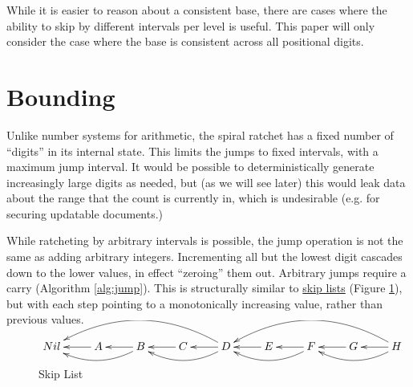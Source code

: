 \documentclass{article}
\begin{document}
	While it is easier to reason about a consistent base, there are cases where the ability to skip by different intervals per level is useful. This paper will only consider the case where the base is consistent across all positional digits.
    
    \section{Bounding}
    
    Unlike number systems for arithmetic, the spiral ratchet has a fixed number of ``digits'' in its internal state. This limits the jumps to fixed intervals, with a maximum jump interval.  It would be possible to deterministically generate increasingly large digits as needed, but (as we will see later) this would leak data about the range that the count is currently in, which is undesirable (e.g. for securing updatable documents.)
    
    While ratcheting by arbitrary intervals is possible, the jump operation is not the same as adding arbitrary integers. Incrementing all but the lowest digit cascades down to the lower values, in effect ``zeroing'' them out. Arbitrary jumps require a carry (Algorithm \ref{alg:jump}). This is structurally similar to \href{https://en.wikipedia.org/wiki/Skip_list}{skip lists} (Figure \ref{fig:skip-list}), but with each step pointing to a monotonically increasing value, rather than previous values. \\
 
	\begin{figure}[h]
		\centering
		
		$\xymatrix{
			  Nil
			& A \ar[l]
			& B \ar[l] , \ar@/^1pc/[ll]
			& C \ar[l]
			& D \ar[l] , \ar@/^1pc/[ll] , \ar@/_2pc/[llll]
			& E \ar[l]
			& F \ar[l] , \ar@/^1pc/[ll]
			& G \ar[l]
			& H \ar[l] , \ar@/^1pc/[ll] , \ar@/_2pc/[llll]
		}$
	
		\caption{Skip List}
		\label{fig:skip-list}
	\end{figure}
\end{document}
